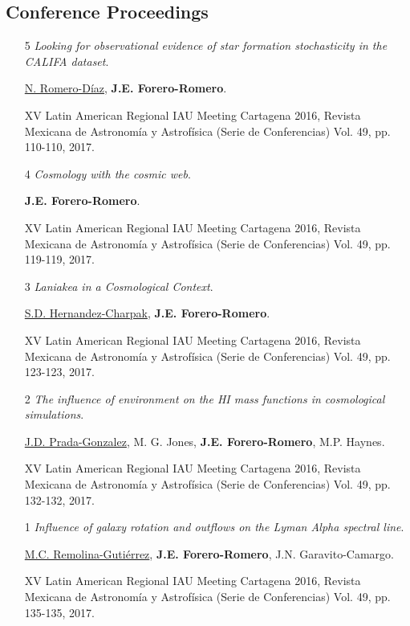 \documentclass{article}
\begin{document}
\subsection{Conference Proceedings}

\begin{itemize}

\item[5]{\it Looking for observational evidence of star formation
  stochasticity in the CALIFA dataset}.
	
\underline{N. Romero-Díaz},  {\bf J.E. Forero-Romero}.

XV Latin American Regional IAU Meeting Cartagena 2016, Revista Mexicana
de Astronomía y Astrofísica (Serie de Conferencias) Vol. 49,
pp. 110-110, 2017.

\item[4]{\it Cosmology with the cosmic web}.

{\bf J.E. Forero-Romero}.

XV Latin American Regional IAU Meeting Cartagena 2016, Revista Mexicana
de Astronomía y Astrofísica (Serie de Conferencias) Vol. 49,
pp. 119-119, 2017.

\item[3]{\it Laniakea in a Cosmological Context}.


\underline{S.D. Hernandez-Charpak}, {\bf J.E. Forero-Romero}.

XV Latin American Regional IAU Meeting Cartagena 2016, Revista Mexicana
de Astronomía y Astrofísica (Serie de Conferencias) Vol. 49,
pp. 123-123, 2017.


\item[2] {\it The influence of environment on the HI mass functions in
  cosmological simulations}.
 
\underline{J.D. Prada-Gonzalez}, M. G. Jones, {\bf J.E. Forero-Romero}, M.P. Haynes.

XV Latin American Regional IAU Meeting Cartagena 2016, Revista Mexicana
de Astronomía y Astrofísica (Serie de Conferencias) Vol. 49,
pp. 132-132, 2017.

\item [1] {\it Influence of galaxy rotation and outflows on the Lyman
  Alpha spectral line}. 
	
\underline{M.C. Remolina-Gutiérrez}, {\bf J.E. Forero-Romero},
J.N. Garavito-Camargo.

XV Latin American Regional IAU Meeting Cartagena 2016, Revista Mexicana
de Astronomía y Astrofísica (Serie de Conferencias) Vol. 49,
pp. 135-135, 2017.
\end{itemize}
\newpage
\end{document}
